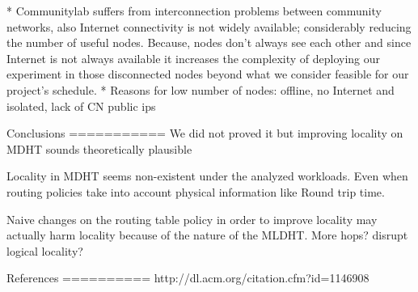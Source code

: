 * Communitylab suffers from interconnection problems between community networks, also Internet connectivity is not widely available; considerably reducing the number of useful nodes. Because, nodes don't always see each other and since Internet is not always available it increases the complexity of deploying our experiment in those disconnected nodes beyond what we consider feasible for our project's schedule.
* Reasons for low number of nodes: offline, no Internet and isolated, lack of CN public ips


Conclusions
===========
We did not proved it but improving locality on MDHT sounds theoretically plausible

Locality in MDHT seems non-existent under the analyzed workloads. Even when routing policies take into account physical information like Round trip time.

Naive changes on the routing table policy in order to improve locality may actually 
harm locality because of the nature of the MLDHT. More hops? disrupt logical locality?

References
==========
http://dl.acm.org/citation.cfm?id=1146908
